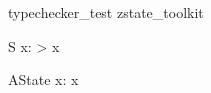 \begin{zsection}
   \SECTION typechecker\_test \parents zstate\_toolkit
\end{zsection}

\zstate
\begin{schema}{S}
   x: \nat
{} > x
\end{schema}

\zstate
\begin{schema}{AState}
   x: \power \nat
\where
  x \neq \emptyset
\end{schema}
